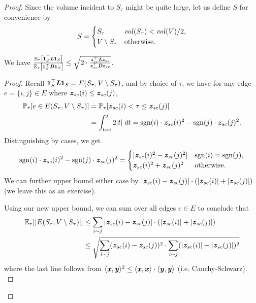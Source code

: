 \begin{proof}
Since the volume incident to $S_{\tau}$ might be quite large, let us define $S$ for convenience by
\[
S = \begin{cases}
        S_{\tau} & \mathit{vol}(S_{\tau}) < \mathit{vol}(V)/2,
        \\
        V \setminus S_{\tau} &\text{otherwise}.
        \end{cases}
\]

\begin{claim}\label{clm:cheegersInequInExpectation}
We have  $\frac{\mathbb{E}_{\tau}\left[\boldsymbol{1}_S^\top \boldsymbol{\mathit{L}} \boldsymbol{1}_S\right]}{\mathbb{E}_{\tau}\left[{\boldsymbol{1}_S^\top \boldsymbol{\mathit{D}} \boldsymbol{1}_S}  \right]} \leq \sqrt{2 \cdot \frac{\boldsymbol{\mathit{z}}_{sc}^\top \boldsymbol{\mathit{L}} \boldsymbol{\mathit{z}}_{sc}}{\boldsymbol{\mathit{z}}_{sc}^\top \boldsymbol{\mathit{D}} \boldsymbol{\mathit{z}}_{sc}}}$.
\end{claim}
\begin{proof}
Recall $\boldsymbol{1}_S^\top \boldsymbol{\mathit{L}} \boldsymbol{1}_S = E(S_{\tau}, V \setminus S_{\tau})$, and by choice of $\tau$, we have for any edge $e = \{i,j\} \in E$ where $\boldsymbol{\mathit{z}}_{sc}(i) \leq \boldsymbol{\mathit{z}}_{sc}(j)$,
\begin{align*}
    \mathbb{P}_{\tau}[e \in E(S_{\tau}, V \setminus S_{\tau})] &= \mathbb{P}_{\tau}[\boldsymbol{\mathit{z}}_{sc}(i) < \tau \leq \boldsymbol{\mathit{z}}_{sc}(j)] \\ &= \int_{t=i}^j 2|t|\; dt = \mathrm{sgn} (i) \cdot \boldsymbol{\mathit{z}}_{sc}(i)^2 - \mathrm{sgn} (j) \cdot \boldsymbol{\mathit{z}}_{sc}(j)^2.
\end{align*}
Distinguishing by cases, we get
\[
\mathrm{sgn} (i) \cdot \boldsymbol{\mathit{z}}_{sc}(i)^2 - \mathrm{sgn} (j) \cdot \boldsymbol{\mathit{z}}_{sc}(j)^2 = \begin{cases}
    |\boldsymbol{\mathit{z}}_{sc}(i)^2 - \boldsymbol{\mathit{z}}_{sc}(j)^2| & \mathrm{sgn} (i) = \mathrm{sgn} (j),
    \\
    \boldsymbol{\mathit{z}}_{sc}(i)^2 + \boldsymbol{\mathit{z}}_{sc}(j)^2 &\text{otherwise}.
    \end{cases} 
\]
We can further upper bound either case by $ |\boldsymbol{\mathit{z}}_{sc}(i) - \boldsymbol{\mathit{z}}_{sc}(j)| \cdot (|\boldsymbol{\mathit{z}}_{sc}(i)| + |\boldsymbol{\mathit{z}}_{sc}(j)|)$ (we leave this as an exercise).

Using our new upper bound, we can sum over all edges $e \in E$ to conclude that
\begin{align*}
   \mathbb{E}_{\tau}[|E(S_{\tau}, V \setminus S_{\tau})|] &\leq \sum_{i \sim j} |\boldsymbol{\mathit{z}}_{sc}(i) - \boldsymbol{\mathit{z}}_{sc}(j)| \cdot (|\boldsymbol{\mathit{z}}_{sc}(i)| + |\boldsymbol{\mathit{z}}_{sc}(j)|) \\
   &\leq \sqrt{\sum_{i \sim j} (\boldsymbol{\mathit{z}}_{sc}(i) - \boldsymbol{\mathit{z}}_{sc}(j))^2 \cdot \sum_{i \sim j} (|\boldsymbol{\mathit{z}}_{sc}(i)| + |\boldsymbol{\mathit{z}}_{sc}(j)|)^2 }
\end{align*}
where the last line follows from $\langle \boldsymbol{\mathit{x}}, \boldsymbol{\mathit{y}} \rangle^2 \leq \langle \boldsymbol{\mathit{x}}, \boldsymbol{\mathit{x}} \rangle \cdot \langle \boldsymbol{\mathit{y}}, \boldsymbol{\mathit{y}} \rangle$ (i.e. Cauchy-Schwarz).\\


\end{proof}
\end{proof}
